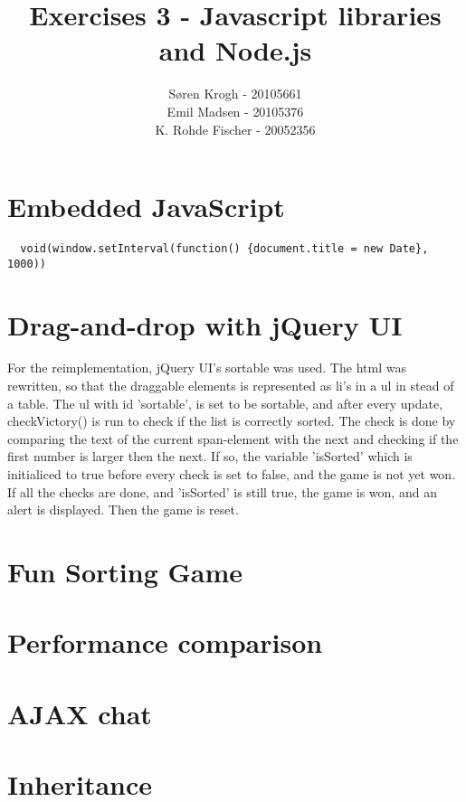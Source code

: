 \documentclass[a4paper,10pt]{article}
\author{
Søren Krogh -  20105661 \\
Emil Madsen - 20105376  \\
K. Rohde Fischer - 20052356\\}
\title{Exercises 3 - Javascript libraries and Node.js}
\begin{document}
\maketitle

\section*{Embedded JavaScript}

\begin{verbatim}
  void(window.setInterval(function() {document.title = new Date}, 1000))
\end{verbatim}


\section*{Drag-and-drop with jQuery UI}
For the reimplementation, jQuery UI's sortable was used.
The html was rewritten, so that the draggable elements is represented as li's in a ul in stead of a table.
The ul with id 'sortable', is set to be sortable, and after every update, checkVictory() is run to check if the list is correctly sorted.
The check is done by comparing the text of the current span-element with the next and checking if the first number is larger then the next. If so, the variable 'isSorted' which is initialiced to true before every check is set to false, and the game is not yet won.
If all the checks are done, and 'isSorted' is still true, the game is won, and an alert is displayed. Then the game is reset.


\section*{Fun Sorting Game}

\section*{Performance comparison}

\section*{AJAX chat}

\section*{Inheritance}
\end{document}
